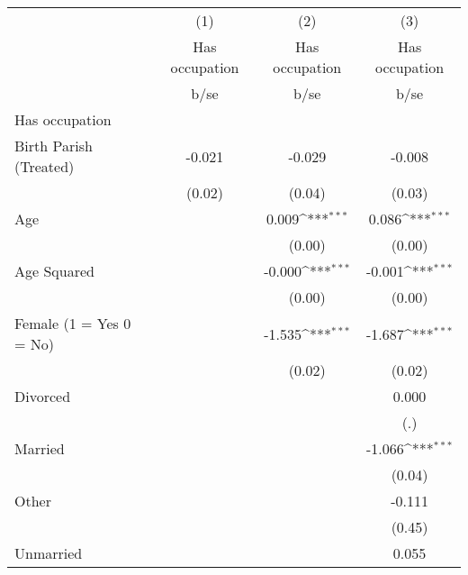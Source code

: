 {
\def\sym#1{\ifmmode^{#1}\else\(^{#1}\)\fi}
\begin{tabular}{l*{3}{c}}
\hline\hline
                    &\multicolumn{1}{c}{(1)}&\multicolumn{1}{c}{(2)}&\multicolumn{1}{c}{(3)}\\
                    &\multicolumn{1}{c}{Has occupation}&\multicolumn{1}{c}{Has occupation}&\multicolumn{1}{c}{Has occupation}\\
                    &        b/se         &        b/se         &        b/se         \\
\hline
Has occupation      &                     &                     &                     \\
Birth Parish (Treated)&      -0.021         &      -0.029         &      -0.008         \\
                    &      (0.02)         &      (0.04)         &      (0.03)         \\
Age                 &                     &       0.009\sym{***}&       0.086\sym{***}\\
                    &                     &      (0.00)         &      (0.00)         \\
Age Squared         &                     &      -0.000\sym{***}&      -0.001\sym{***}\\
                    &                     &      (0.00)         &      (0.00)         \\
Female (1 = Yes 0 = No)&                     &      -1.535\sym{***}&      -1.687\sym{***}\\
                    &                     &      (0.02)         &      (0.02)         \\
Divorced            &                     &                     &       0.000         \\
                    &                     &                     &         (.)         \\
Married             &                     &                     &      -1.066\sym{***}\\
                    &                     &                     &      (0.04)         \\
Other               &                     &                     &      -0.111         \\
                    &                     &                     &      (0.45)         \\
Unmarried           &                     &                     &       0.055         \\

\end{tabular}}
